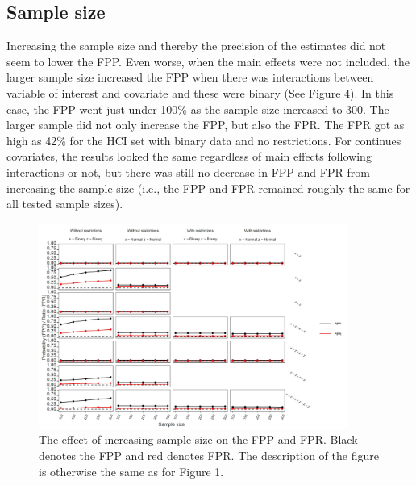 \subsection{Sample size}
Increasing the sample size and thereby the precision of the estimates did not seem to lower the FPP. Even worse, when the main effects were not included, the larger sample size increased the FPP when there was interactions between variable of interest and covariate and these were binary (See Figure 4). In this case, the FPP went just under 100\% as the sample size increased to 300. The larger sample did not only increase the FPP, but also the FPR. The FPR got as high as 42\% for the HCI set with binary data and no restrictions. For continues covariates, the results looked the same regardless of main effects following interactions or not, but there was still no decrease in FPP and FPR from increasing the sample size (i.e., the FPP and FPR remained roughly the same for all tested sample sizes). 


\begin{figure}[hbt!]
\includegraphics[width=0.9\textwidth]{R/Analysis/Result/Figures/Figure1D.jpeg}
\centering
\caption{The effect of increasing sample size on the FPP and FPR. Black denotes the FPP and red denotes FPR. The description of the figure is otherwise the same as for Figure 1.}
\label{fig:mainfigure}
\end{figure}

